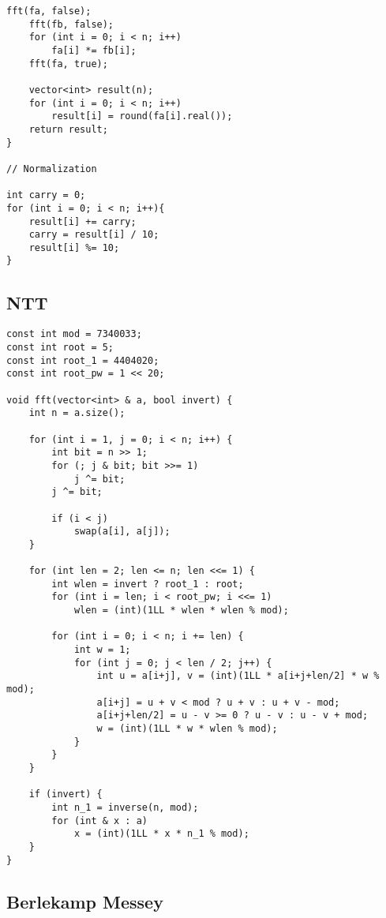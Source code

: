 \documentclass[10pt]{article}
\begin{document}
\begin{multicols*}{2}
\begin{lstlisting}[style=compactcpp]
    fft(fa, false);
    fft(fb, false);
    for (int i = 0; i < n; i++)
        fa[i] *= fb[i];
    fft(fa, true);

    vector<int> result(n);
    for (int i = 0; i < n; i++)
        result[i] = round(fa[i].real());
    return result;
}

// Normalization

int carry = 0;
for (int i = 0; i < n; i++){
    result[i] += carry;
    carry = result[i] / 10;
    result[i] %= 10;
}

\end{lstlisting}

\subsection{NTT}

\begin{lstlisting}[style=compactcpp]
const int mod = 7340033;
const int root = 5;
const int root_1 = 4404020;
const int root_pw = 1 << 20;

void fft(vector<int> & a, bool invert) {
    int n = a.size();

    for (int i = 1, j = 0; i < n; i++) {
        int bit = n >> 1;
        for (; j & bit; bit >>= 1)
            j ^= bit;
        j ^= bit;

        if (i < j)
            swap(a[i], a[j]);
    }

    for (int len = 2; len <= n; len <<= 1) {
        int wlen = invert ? root_1 : root;
        for (int i = len; i < root_pw; i <<= 1)
            wlen = (int)(1LL * wlen * wlen % mod);

        for (int i = 0; i < n; i += len) {
            int w = 1;
            for (int j = 0; j < len / 2; j++) {
                int u = a[i+j], v = (int)(1LL * a[i+j+len/2] * w % mod);
                a[i+j] = u + v < mod ? u + v : u + v - mod;
                a[i+j+len/2] = u - v >= 0 ? u - v : u - v + mod;
                w = (int)(1LL * w * wlen % mod);
            }
        }
    }

    if (invert) {
        int n_1 = inverse(n, mod);
        for (int & x : a)
            x = (int)(1LL * x * n_1 % mod);
    }
}
\end{lstlisting}

\subsection{Berlekamp Messey}


\end{multicols*}
\end{document}
